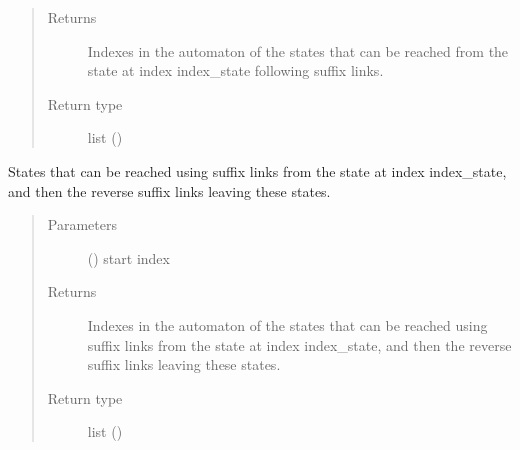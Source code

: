 \documentclass[letterpaper,10pt,english]{sphinxmanual}
\begin{document}
\begin{fulllineitems}
\begin{fulllineitems}
\begin{quote}
\begin{description}
\item[{Returns}] \leavevmode
Indexes in the automaton of the states that can be reached from the state at index index\_state following suffix links.

\item[{Return type}] \leavevmode
list ()

\end{description}\end{quote}

\end{fulllineitems}


\begin{fulllineitems}
\label{\detokenize{index:Model.FactorOracle.follow_suffix_links_then_reverse_from}}
States that can be reached using suffix links from the state at index index\_state, and then the reverse suffix links leaving these states.
\begin{quote}\begin{description}
\item[{Parameters}] \leavevmode
{} () \textendash{} start index

\item[{Returns}] \leavevmode
Indexes in the automaton of the states that can be reached using suffix links from the state at index index\_state, and then the reverse suffix links leaving these states.

\item[{Return type}] \leavevmode
list ()

\end{description}\end{quote}

\end{fulllineitems}



\end{fulllineitems}
\end{document}
